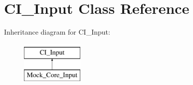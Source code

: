 \hypertarget{class_c_i___input}{}\section{C\+I\+\_\+\+Input Class Reference}
\label{class_c_i___input}
Inheritance diagram for C\+I\+\_\+\+Input\+:\begin{figure}[H]
\begin{center}
\leavevmode
\includegraphics[height=2.000000cm]{class_c_i___input}
\end{center}
\end{figure}
